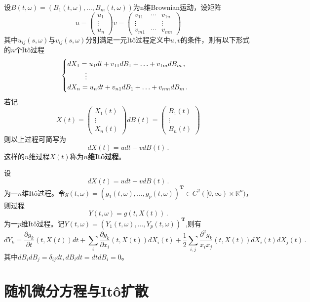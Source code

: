 \documentclass[oneside]{sysuthesis}
\begin{document}
\begin{definition}\label{def:multi_Ito_process}
	设$B(t,\omega)=(B_1(t,\omega),\ldots,B_m(t,\omega))$为n维Brownian运动，设矩阵
	\[
	u=
	\begin{pmatrix}
		u_1 \\
		\vdots \\
		u_n
	\end{pmatrix}
	v=
	\begin{pmatrix}
		v_{11} &\cdots & v_{1n} \\
		\vdots & &\vdots \\
		v_{m1} &\cdots & v_{mn}
	\end{pmatrix}
	\]
	其中$u_{ij}(s,\omega)$与$v_{ij}(s,\omega)$分别满足一元It\^o过程定义中$u,v$的条件，则有以下形式的$n$个It\^o过程
	\[
	\begin{cases}
		dX_1=u_1dt+v_{11}dB_1+\ldots+v_{1m}dB_m\,,\\
		\hspace{0.9cm}\vdots\\
		dX_n=u_ndt+v_{n1}dB_1+\ldots+v_{nm}dB_m\,.
	\end{cases}
	\]
	若记
	\[
	X(t)=
	\begin{pmatrix}
		X_1(t) \\
		\vdots \\
		X_n(t)
	\end{pmatrix}
	dB(t)=
	\begin{pmatrix}
		B_1(t) \\
		\vdots \\
		B_n(t)
	\end{pmatrix}
	\]
	则以上过程可简写为
	\[
	dX(t)=udt+vdB(t)\,.
	\]
	这样的$n$维过程$X(t)$称为\textbf{$n$维It\^o过程}。
\end{definition}

\begin{theorem}\label{theo:multi_Ito_formula}
	设
	\[
	dX(t)=udt+vdB(t)\,.
	\]
	为一$n$维It\^o过程。令$g(t,\omega)=(g_1(t,\omega),\ldots,g_p(t,\omega))^\mathbf{T}\in C^2([0,\infty)\times\mathbb{R}^n)$，则过程
	\[
	Y(t,\omega)=g(t,X(t))\,.
	\]
	为一$p$维It\^o过程。记$Y(t,\omega)=(Y_1(t,\omega),\ldots,Y_p(t,\omega))^\mathbf{T}$,则有
	\[
	dY_k=\frac{\partial g_k}{\partial t}(t,X(t))dt+\sum_i\frac{\partial g_k}{\partial x_i}(t,X(t))dX_i(t)+\frac{1}{2}\sum_{i,j}\frac{\partial^2g_k}{x_i x_j}(t,X(t))dX_i(t)dX_j(t)\,.
	\]
	其中$dB_idB_j=\delta_{ij}dt,dB_idt=dtdB_i=0$。
\end{theorem}

\section{随机微分方程与It\^o扩散}
\end{document}
